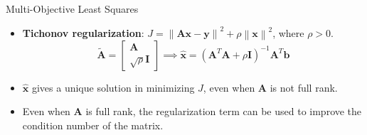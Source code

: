 \documentclass[aspectratio=169]{beamer}
\begin{document}
\begin{frame}[t]{Multi-Objective Least Squares}
\begin{small}
\begin{itemize}
    \item \textbf{Tichonov regularization}: $J = \left\lVert \mathbf{Ax} - \mathbf{y}\right\rVert^2 + \rho \left\lVert \mathbf{x} \right\rVert^2$, where $\rho > 0$.
    \[ \tilde{\mathbf{A}} = \begin{bmatrix*}\mathbf{A}\\\sqrt{\rho}\mathbf{I}\end{bmatrix*} \implies \hat{\mathbf{x}} =  \left(\mathbf{A}^T\mathbf{A} + \rho \mathbf{I}\right)^{-1}\mathbf{A}^T\mathbf{b} \]
    \item $\hat{\mathbf{x}}$ gives a unique solution in minimizing $J$, even when $\mathbf{A}$ is not full rank.
    \item Even when $\mathbf{A}$ is full rank, the regularization term can be used to improve the condition number of the matrix.
\end{itemize}
\end{small}
\end{frame}
\end{document}
